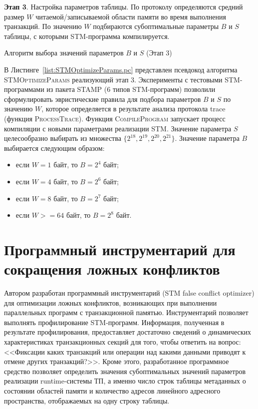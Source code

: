 \textbf{Этап 3}. Настройка параметров таблицы. По протоколу определяются средний размер $W$ читаемой/записываемой области памяти во время выполнения транзакций. По значению $W$ подбираются субоптимальные параметры $B$ и $S$ таблицы, с которыми STM-программа компилируется.

\begin{algorithm}[!h]
	
    \caption{Алгоритм выбора значений параметров $B$ и $S$ (Этап 3)}
    \label{list:STMOptimizeParams.pc}
\end{algorithm}

В Листинге~\ref{list:STMOptimizeParams.pc} представлен псевдокод алгоритма \textsc{STMOptimizeParams} реализующий этап 3. Эксперименты с тестовыми STM-программами из пакета STAMP (6 типов STM-программ) позволили сформулировать эвристические правила для подбора параметров $B$ и $S$ по значению $W$, которое определяется в результате анализа протокола trace (функция \textsc{ProcessTrace}). Функция \textsc{CompileProgram} запускает процесс компиляции с новыми параметрами реализации STM. Значение параметра $S$ целесообразно выбирать из множества $\{2^{18}, 2^{19}, 2^{20}, 2^{21}\}$. Значение параметра $B$ выбирается следующим образом:
\begin{itemize}
\item если $\textit{W} = 1$ байт, то $\textit{B} = 2^{4}$ байт;
\item если $\textit{W} = 4$ байт, то $\textit{B} = 2^{6}$ байт;
\item если $\textit{W} = 8$ байт, то $\textit{B} = 2^{7}$ байт;
\item если $\textit{W} >= 64$ байт, то $\textit{B} = 2^{8}$ байт.
\end{itemize}

\section{Программный инструментарий для сокращения ложных конфликтов}
Автором разработан программный инструментарий (STM false conflict optimizer) для оптимизации ложных конфликтов, возникающих при выполнении параллельных программ с транзакционной памятью. Инструментарий позволяет выполнять профилирование STM-программ. Информация, полученная в результате профилирования, предоставляет достаточно сведений о динамических характеристиках транзакционных секций для того, чтобы ответить на вопрос: <<Фиксации каких транзакций или операции над какими данными приводят к отмене других транзакций?>>. Кроме этого, разработанное программное средство позволяет определить значения субоптимальных значений параметров реализации runtime-системы ТП, а именно число строк таблицы метаданных о состоянии областей памяти и количество адресов линейного адресного пространства, отображаемых на одну строку таблицы.

